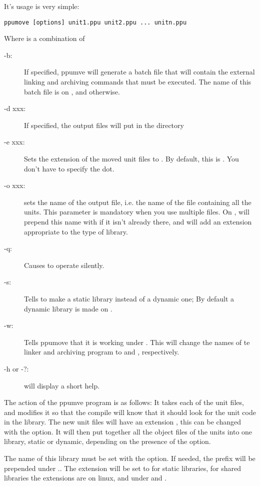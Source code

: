 \documentclass{book}
\begin{document}
It's usage is very simple:
\begin{verbatim}
ppumove [options] unit1.ppu unit2.ppu ... unitn.ppu
\end{verbatim}
Where  is a combination of
\begin{description}
\item[-b:\ ] If specified, ppumve will generate a batch file that will
contain the external linking and archiving commands that must be
executed. The name of this batch file is  on \linux, and
 otherwise.
\item[-d xxx:\ ] If specified, the output files will put in the directory
\item[-e xxx:\ ] Sets the extension of the moved unit files to .
By default, this is . You don't have to specify the dot.
\item[-o xxx:\ ] sets the name of the output file, i.e. the name of the file
containing all the units. This parameter is mandatory when you use multiple
files. On \linux,  will prepend this name with  if it isn't
already there, and will add an extension appropriate to the type of library.
\item [-q:\ ] Causes  to operate silently.
\item [-s:\ ] Tells  to make a static library instead of a
dynamic one; By default a dynamic library is made on \linux.
\item [-w:\ ] Tells ppumove that it is working under \windowsnt. This will
change the names of te linker and archiving program to  and
, respectively.
\item[-h or -?:\ ] will display a short help.
\end{description}

The action of the ppumve program is as follows:
It takes each of the unit files, and modifies it so that the compile will
know that it should look for the unit code in the library. The new unit
files will have an extension , this can be changed with the
 option. It will then put together all the object files of the units
into one library, static or dynamic, depending on the presence of the
 option.

The name of this library must be set with the  option.
If needed, the prefix  will be prepended under \linux..
The extension will be set to  for static libraries,
for shared libraries the extensions are  on linux, and 
under \windowsnt and \ostwo.
\end{document}
